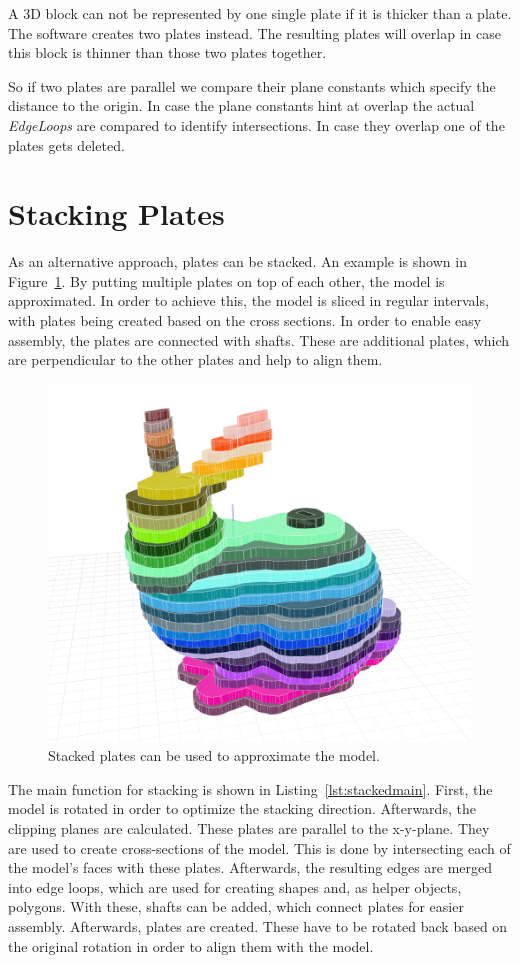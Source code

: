 \documentclass[../ClassicThesis.tex]{subfiles}
\begin{document}
A 3D block can not be represented by one single plate if it is thicker than a plate. The software creates two plates instead. The resulting plates will overlap in case this block is thinner than those two plates together.

So if two plates are parallel we compare their plane constants which specify the distance to the origin. In case the plane constants hint at overlap the actual \emph{EdgeLoops} are compared to identify intersections. In case they overlap one of the plates gets deleted.


\section{Stacking Plates}\label{sec:stackedplates}

As an alternative approach, plates can be stacked. An example is shown in Figure~\ref{fig:stackedbunny}. By putting multiple plates on top of each other, the model is approximated. In order to achieve this, the model is sliced in regular intervals, with plates being created based on the cross sections. In order to enable easy assembly, the plates are connected with shafts. These are additional plates, which are perpendicular to the other plates and help to align them.

\begin{figure}
    \centering
    \includegraphics[width=.5\textwidth]{Images/bunny_1.png}
    \caption{Stacked plates can be used to approximate the model.}
    \label{fig:stackedbunny}
\end{figure}

The main function for stacking is shown in Listing~\ref{lst:stackedmain}. First, the model is rotated in order to optimize the stacking direction. Afterwards, the clipping planes are calculated. These plates are parallel to the x-y-plane. They are used to create cross-sections of the model. This is done by intersecting each of the model's faces with these plates. Afterwards, the resulting edges are merged into edge loops, which are used for creating shapes and, as helper objects, polygons. With these, shafts can be added, which connect plates for easier assembly. Afterwards, plates are created. These have to be rotated back based on the original rotation in order to align them with the model. 
\end{document}
